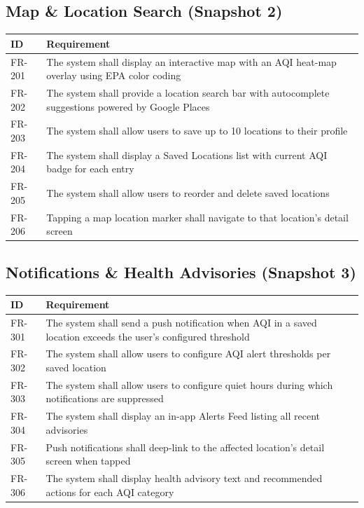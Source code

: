 \documentclass[12pt]{article}
\begin{document}
\subsection{Map \& Location Search (Snapshot 2)}
\begin{tabularx}{\textwidth}{@{}L{2.2cm}Y@{}}
\toprule
\textbf{ID} & \textbf{Requirement} \\
\midrule
FR-201 & The system shall display an interactive map with an AQI heat-map overlay using EPA color coding \\
FR-202 & The system shall provide a location search bar with autocomplete suggestions powered by Google Places \\
FR-203 & The system shall allow users to save up to 10 locations to their profile \\
FR-204 & The system shall display a Saved Locations list with current AQI badge for each entry \\
FR-205 & The system shall allow users to reorder and delete saved locations \\
FR-206 & Tapping a map location marker shall navigate to that location's detail screen \\
\bottomrule
\end{tabularx}

\subsection{Notifications \& Health Advisories (Snapshot 3)}
\begin{tabularx}{\textwidth}{@{}L{2.2cm}Y@{}}
\toprule
\textbf{ID} & \textbf{Requirement} \\
\midrule
FR-301 & The system shall send a push notification when AQI in a saved location exceeds the user's configured threshold \\
FR-302 & The system shall allow users to configure AQI alert thresholds per saved location \\
FR-303 & The system shall allow users to configure quiet hours during which notifications are suppressed \\
FR-304 & The system shall display an in-app Alerts Feed listing all recent advisories \\
FR-305 & Push notifications shall deep-link to the affected location's detail screen when tapped \\
FR-306 & The system shall display health advisory text and recommended actions for each AQI category \\
\bottomrule
\end{tabularx}
\end{document}
